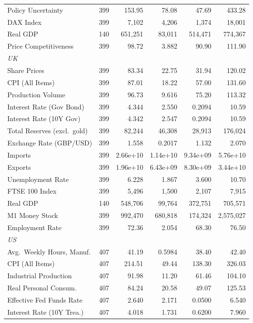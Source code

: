\begin{longtable}{lrrrrr}
Policy Uncertainty & 399 & 153.95 & 78.08 & 47.69 & 433.28 \\
DAX Index & 399 & 7,102 & 4,206 & 1,374 & 18,001 \\
Real GDP & 140 & 651,251 & 83,011 & 514,471 & 774,367 \\
Price Competitiveness & 399 & 98.72 & 3.882 & 90.90 & 111.90 \\
\addlinespace
\textit{UK} & & & & & \\
Share Prices & 399 & 83.34 & 22.75 & 31.94 & 120.02 \\
CPI (All Items) & 399 & 87.01 & 18.22 & 57.00 & 131.60 \\
Production Volume & 399 & 96.73 & 9.616 & 75.20 & 113.32 \\
Interest Rate (Gov Bond) & 399 & 4.344 & 2.550 & 0.2094 & 10.59 \\
Interest Rate (10Y Gov) & 399 & 4.342 & 2.547 & 0.2094 & 10.59 \\
Total Reserves (excl.\ gold) & 399 & 82,244 & 46,308 & 28,913 & 176,024 \\
Exchange Rate (GBP/USD) & 399 & 1.558 & 0.2017 & 1.132 & 2.070 \\
Imports & 399 & 2.66e+10 & 1.14e+10 & 9.34e+09 & 5.76e+10 \\
Exports & 399 & 1.96e+10 & 6.43e+09 & 8.30e+09 & 3.44e+10 \\
Unemployment Rate & 399 & 6.228 & 1.867 & 3.600 & 10.70 \\
FTSE 100 Index & 399 & 5,496 & 1,500 & 2,107 & 7,915 \\
Real GDP & 140 & 548,706 & 99,764 & 372,751 & 705,571 \\
M1 Money Stock & 399 & 992,470 & 680,818 & 174,324 & 2,575,027 \\
Employment Rate & 399 & 72.36 & 2.054 & 68.30 & 76.50 \\
\addlinespace
\textit{US} & & & & & \\
Avg.\ Weekly Hours, Manuf. & 407 & 41.19 & 0.5984 & 38.40 & 42.40 \\
CPI (All Items) & 407 & 214.51 & 49.44 & 138.30 & 326.03 \\
Industrial Production & 407 & 91.98 & 11.20 & 61.46 & 104.10 \\
Real Personal Consum. & 407 & 84.24 & 20.58 & 49.07 & 125.53 \\
Effective Fed Funds Rate & 407 & 2.640 & 2.171 & 0.0500 & 6.540 \\
Interest Rate (10Y Trea.) & 407 & 4.018 & 1.731 & 0.6200 & 7.960 \\

\end{longtable}

